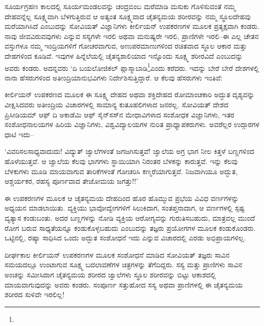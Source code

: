 ಸೂರ್ಯಗ್ರಹಣ ಕಾಲದಲ್ಲಿ ಸೂರ್ಯಮಂಡಲವನ್ನು ಚಂದ್ರಬಿಂಬ ಮರೆಮಾಡಿ ಮಸುಕು ಗೊಳಿಸುವಂತೆ ನಮ್ಮ ದೇಹವನ್ನೆಲ್ಲ ಸೂಕ್ಷ್ಮವಾಗಿ ಬೆಳಗುತ್ತಿರುವ ಆ ಅತ್ಯಂತ ಸೂಕ್ಷ್ಮವಾದ ಚೈತನ್ಯ\-ಮಯ ಶರೀರವನ್ನು ನಮ್ಮ ಸ್ಥೂಲದೇಹವು ಮರೆಯಾಗಿಸಿದೆ ಎಂಬುದನ್ನು ಸೋವಿಯತ್ ವಿಜ್ಞಾನಿಗಳು ಕೀರ್ಲಿಯನ್ ಉಪಕರಣಗಳ ಮೂಲಕ ಪ್ರತ್ಯಕ್ಷವಾಗಿ ಕಂಡರು. ನಾವು ಜೀವವಿರುವವುಗಳು ಎನ್ನುವ ಸಸ್ಯಗಳೇ ಇರಲಿ ಅಥವಾ ಮನುಷ್ಯರೇ ಇರಲಿ, ಪ್ರಾಣಿಗಳೇ ಇರಲಿ–ಈ ಎಲ್ಲ ಚೇತನ ವಸ್ತುಗಳೂ ನಮ್ಮ ಇಂದ್ರಿಯಗಳಿಗೆ ಗೋಚರವಾಗುವ, ಅಣುಪರಮಾಣುಗಳಿಂದ ರಚಿತವಾದ ಸ್ಥೂಲ ಆಕಾರ ಮತ್ತು ದೇಹಗಳಿಂದ ಕೂಡಿವೆ. ಇವುಗಳ ಹಿನ್ನೆಲೆಯಲ್ಲಿ ಚೈತನ್ಯಶಾಲಿಯಾದ ಇನ್ನೊಂದು ಸೂಕ್ಷ್ಮ ಶರೀರವಿದೆ ಎಂಬುದನ್ನು ಅವರು ಕಂಡರು. ಅದನ್ನವರು ‘ದಿ ಬಯಲೋಜಿಕಲ್ ಪ್ಲಾಸ್ಮಾಬಾಡಿ\footnote{}ಎಂದು ಕರೆದರು. ಇದನ್ನು ಬೇರೆ ಬೇರೆ ದೇಶಗಳಲ್ಲಿ ನಾನಾ ಹೆಸರುಗಳಿಂದ ಅತೀಂದ್ರಿಯಾನುಭವಿಗಳು ನಿರ್ದೇಶಿಸುತ್ತಿದ್ದಾರೆ. ಆ ಕೆಲವು ಹೆಸರುಗಳು ಇಂತಿವೆ: 

ಕೀರ್ಲಿಯನ್ ಉಪಕರಣದ ಮೂಲಕ ಈ ಸೂಕ್ಷ್ಮ ದೇಹದ ಅಥವಾ ಶಕ್ತಿದೇಹದ ರೋಮಾಂಚ\-ಕಾರಿ ಅದ್ಭುತ ದೃಶ್ಯವನ್ನು ವೀಕ್ಷಿಸಿದವರು ಅತೀಂದ್ರಿಯ ವಿಚಾರಗಳಲ್ಲಿ ಸಾಮಾನ್ಯ ಕುತೂಹಲಿ\-ಗಳಾದ ಜನರಲ್ಲ. ಸೋವಿಯತ್ ದೇಶದ ಪ್ರಿಸೀಡಿಯಮ್ ಆಫ್ ದಿ ಅಕಾಡೆಮಿ ಆಫ್ ಸೈನ್​ಸಸ್​ನ ಮೇಧಾವಿಗಳಾದ ಸಂಶೋಧಕ ವಿಜ್ಞಾನಿಗಳು, ಇತರ ಸಂಶೋಧನಾಲಯಗಳ ಹಿರಿಯ ವಿಜ್ಞಾನಿಗಳು, ವಿಶ್ವವಿದ್ಯಾಲಯಗಳ ನುರಿತ ಪ್ರಾಧ್ಯಾಪಕರುಗಳು. ಅವರೆಲ್ಲರ ಉದ್ಗಾರಗಳ ಧಾಟಿ ಇದು–

‘ವಿವರಿಸಲಸಾಧ್ಯವಾದುದು! ವಿದ್ಯುತ್ ಜ್ವಾಲೆಗಳಂತೆ ಜಗಜಗಿಸುತ್ತವೆ! ಜ್ವಾಲೆಯ ಅಗ್ರ ಭಾಗ ನೀಲ ಕಿತ್ತಳೆ ಬಣ್ಣಗಳಿಂದ ಹೊಳೆಯುತ್ತವೆ. ಆ ಜ್ವಾಲೆಯ ಕೆಲವು ಭಾಗಗಳು ಸ್ಥಾಯಿಯಾಗಿ ನಿರಂತರ ಬೆಳಕನ್ನು ಕಾರುತ್ತವೆ. ಇನ್ನು ಕೆಲವು ಬೆಳಕುಗಳು ಮೂಡಿ ಮಾಯವಾಗುವ ತಾರಿಕೆಗಳಂತೆ ಗೋಚರಿಸಿ ಕಣ್ಮರೆಯಾಗುತ್ತವೆ. ನಿಜವಾಗಿಯೂ ಅದ್ಭುತ, ಆಶ್ಚರ್ಯಕರ, ರಹಸ್ಯ ಪೂರ್ಣವಾದ ತೇಜೋಮಯ ಜಗತ್ತು!!’

ಈ ಉಪಕರಣಗಳ ಮೂಲಕ ಆ ಚೈತನ್ಯಮಯ ದೇಹದಿಂದ ಹೊರ ಹೊಮ್ಮುವ ಪ್ರಭೆಯ ವಿವಿಧ ವರ್ಣಗಳನ್ನು ಅಧ್ಯಯನ ಮಾಡಲಾಯಿತು. ವ್ಯಕ್ತಿಯು ಭಾವೋದ್ವೇಗಗಳಿಗೆ ಸಿಲುಕಿದಾಗ, ಸಂತಪ್ತನಾದಾಗ, ಆ ವರ್ಣಗಳಲ್ಲಿ ಸ್ಪಷ್ಟ ವ್ಯತ್ಯಾಸ ಕಂಡುಬಂತು. ಅದರ ಬಣ್ಣಗಳನ್ನು ನೋಡಿ ವ್ಯಕ್ತಿಯ ಆರೋಗ್ಯವನ್ನು ಗುರುತಿಸಬಹುದು, ಮಾತ್ರವಲ್ಲ ಮುಂದೆ ರೋಗ ಬರುವ ಸಾಧ್ಯತೆಯನ್ನೂ ಕಂಡುಕೊಳ್ಳಬಹುದು ಎಂಬುದನ್ನು ತಜ್ಞರು ಪ್ರಯೋಗಗಳ ಮೂಲಕ ಕಂಡುಕೊಂಡರು. ಒಟ್ಟಿನಲ್ಲಿ, ರಷ್ಯಾ ಸಾಧಿಸಿದ ಒಂದು ಅದ್ಭುತ ಸಂಶೋಧನೆ ಇದು ಎನ್ನುವ ವಿಚಾರದಲ್ಲಿ ಎರಡು ಅಭಿಪ್ರಾಯಗಳಿಲ್ಲ.

ದೀರ್ಘಕಾಲ ಕೀರ್ಲಿಯನ್ ಉಪಕರಣಗಳ ಮೂಲಕ ಸಂಶೋಧನೆ ಮಾಡಿದ ಸೋವಿಯತ್ ತಜ್ಞರು ಸಾವಿನ ಸಮಯದಲ್ಲೂ ಉಂಟಾಗುವ ಸೂಕ್ಷ್ಮ ಬದಲಾವಣೆಗಳ ಚಿತ್ರಗಳನ್ನು ತೆಗೆದಿದ್ದರು. ಸಸ್ಯ ಮತ್ತು ಪ್ರಾಣಿಗಳು ಸಾವಿನ ಅಂಚನ್ನು ಸಮೀಸಿದಾಗ ಚೈತನ್ಯಮಯ ಶರೀರದ ಜ್ವಾಲೆಗಳು ಸ್ಥೂಲ ಶರೀರವನ್ನು ಬಿಟ್ಟು ಆಕಾಶದಲ್ಲಿ ಮಾಯವಾಗುವುದನ್ನು ಅವರು ಕಂಡರು. ಸಂಪೂರ್ಣ ಸತ್ತುಹೋದ ಸಸ್ಯ ಅಥವಾ ಪ್ರಾಣಿಗಳಲ್ಲಿ ಈ ಚೈತನ್ಯಮಯ ಶರೀರದ ಸುಳಿವೇ ಇರಲಿಲ್ಲ!

